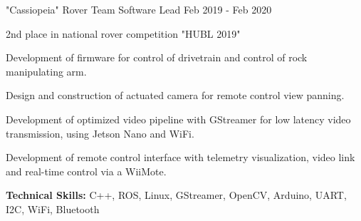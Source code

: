 \begin{cventries}
  \cventry
    {"Cassiopeia" Rover Team} %
    {Software Lead} %
    {} %
    {Feb 2019 - Feb 2020} %
    {
      \begin{cvitems} %
        \item {2nd place in national rover competition "HUBL 2019"}
        \item {Development of firmware for control of drivetrain and control of rock manipulating arm.}
        \item {Design and construction of actuated camera for remote control view panning.}
        \item {Development of optimized video pipeline with GStreamer for low latency video transmission, using Jetson Nano and WiFi.}
        \item {Development of remote control interface with telemetry visualization, video link and real-time control via a WiiMote.}
        \item {\textbf{Technical Skills:} C++, ROS, Linux, GStreamer, OpenCV, Arduino, UART, I2C, WiFi, Bluetooth}
      \end{cvitems}
    }

\end{cventries}
